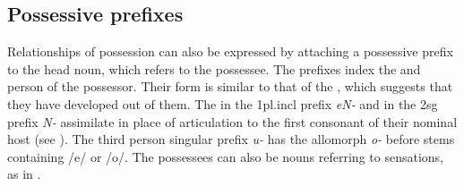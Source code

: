 \begin{table}
\end{table}


\subsection{Possessive prefixes}

Relationships of possession can also be expressed by attaching a possessive prefix to the head noun, which refers to the possessee. The prefixes index the  and person of the possessor. Their form is similar to that of the , which suggests that they have developed out of them. The  in the {\sc 1pl.incl} prefix \emph{eN-} and in the {\sc 2sg} prefix \emph{N-} assimilate in place of articulation to the first consonant of their nominal host (see \Next). The third person singular prefix \emph{u-} has the allomorph \emph{o-} before stems containing /e/ or /o/. The possessees can also be nouns referring to sensations, as in \Next[a]. 

